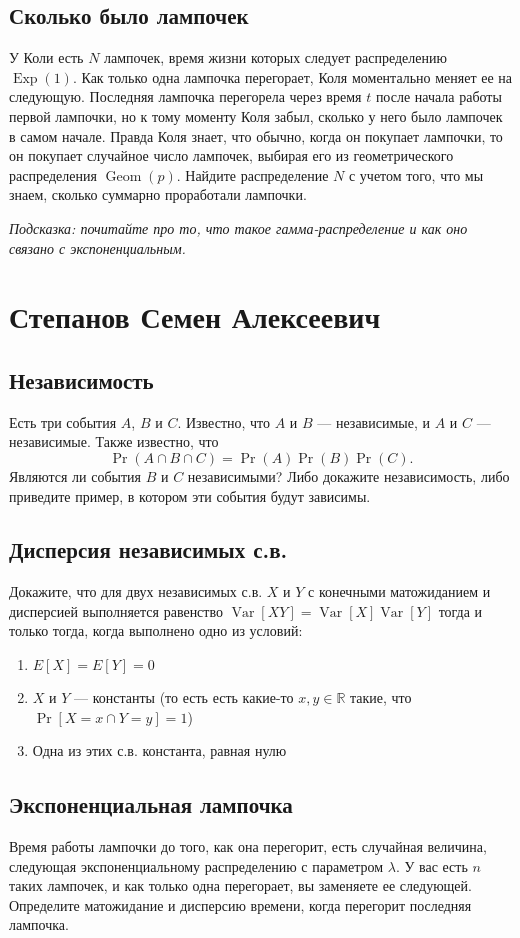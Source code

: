 \documentclass[12pt]{article}
\newcommand\R{\mathbb{R}}
\DeclareMathOperator{\Geom}{Geom}
\DeclareMathOperator{\Exp}{Exp}
\DeclareMathOperator{\Var}{Var}
\begin{document}
\subsection{Сколько было лампочек}
У Коли есть $N$ лампочек, время жизни которых следует распределению $\Exp(1)$. Как только одна лампочка перегорает, Коля моментально меняет ее на следующую. Последняя лампочка перегорела через время $t$ после начала работы первой лампочки, но к тому моменту Коля забыл, сколько у него было лампочек в самом начале. Правда Коля знает, что обычно, когда он покупает лампочки, то он покупает случайное число лампочек, выбирая его из геометрического распределения $\Geom(p)$. Найдите распределение $N$ с учетом того, что мы знаем, сколько суммарно проработали лампочки. 

\emph{Подсказка: почитайте про то, что такое гамма-распределение и как оно связано с экспоненциальным.}

\newpage
\section{Степанов Семен Алексеевич}

\subsection{Независимость}
Есть три события $A$, $B$ и $C$. Известно, что $A$ и $B$ --- независимые, и $A$ и $C$ --- независимые. Также известно, что \[\Pr(A \cap B \cap C) = \Pr(A)\Pr(B)\Pr(C).\] Являются ли события $B$ и $C$ независимыми? Либо докажите независимость, либо приведите пример, в котором эти события будут зависимы.

\subsection{Дисперсия независимых с.в.}
Докажите, что для двух независимых с.в. $X$ и $Y$ с конечными матожиданием и дисперсией выполняется равенство $\Var[XY] = \Var[X]\Var[Y]$ тогда и только тогда, когда выполнено одно из условий:
\begin{enumerate}
    \item $E[X] = E[Y] = 0$
    \item $X$ и $Y$ --- константы (то есть есть какие-то $x, y \in \R$ такие, что $\Pr[X = x \cap Y = y] = 1$)
    \item Одна из этих с.в. константа, равная нулю
\end{enumerate}

\subsection{Экспоненциальная лампочка}
Время работы лампочки до того, как она перегорит, есть случайная величина, следующая экспоненциальному распределению с параметром $\lambda$. У вас есть $n$ таких лампочек, и как только одна перегорает, вы заменяете ее следующей. Определите матожидание и дисперсию времени, когда перегорит последняя лампочка.
\end{document}
